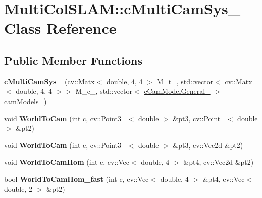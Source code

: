 \hypertarget{classMultiColSLAM_1_1cMultiCamSys__}{}\section{Multi\+Col\+S\+L\+AM\+:\+:c\+Multi\+Cam\+Sys\+\_\+ Class Reference}
\label{classMultiColSLAM_1_1cMultiCamSys__}
\subsection*{Public Member Functions}
\begin{DoxyCompactItemize}
\item 
{\bfseries c\+Multi\+Cam\+Sys\+\_\+} (cv\+::\+Matx$<$ double, 4, 4 $>$ M\+\_\+t\+\_\+, std\+::vector$<$ cv\+::\+Matx$<$ double, 4, 4 $>$$>$ M\+\_\+c\+\_\+, std\+::vector$<$ \hyperlink{classMultiColSLAM_1_1cCamModelGeneral__}{c\+Cam\+Model\+General\+\_\+} $>$ cam\+Models\+\_\+)\hypertarget{classMultiColSLAM_1_1cMultiCamSys___a94d83f3bd851844d9b86866b899aac14}{}\label{classMultiColSLAM_1_1cMultiCamSys___a94d83f3bd851844d9b86866b899aac14}

\item 
void {\bfseries World\+To\+Cam} (int c, cv\+::\+Point3\+\_\+$<$ double $>$ \&pt3, cv\+::\+Point\+\_\+$<$ double $>$ \&pt2)\hypertarget{classMultiColSLAM_1_1cMultiCamSys___a5252fc027f0a0f8db1b096392302eae8}{}\label{classMultiColSLAM_1_1cMultiCamSys___a5252fc027f0a0f8db1b096392302eae8}

\item 
void {\bfseries World\+To\+Cam} (int c, cv\+::\+Point3\+\_\+$<$ double $>$ \&pt3, cv\+::\+Vec2d \&pt2)\hypertarget{classMultiColSLAM_1_1cMultiCamSys___abfc2a17f67cd88fbf51e1459b5618c96}{}\label{classMultiColSLAM_1_1cMultiCamSys___abfc2a17f67cd88fbf51e1459b5618c96}

\item 
void {\bfseries World\+To\+Cam\+Hom} (int c, cv\+::\+Vec$<$ double, 4 $>$ \&pt4, cv\+::\+Vec2d \&pt2)\hypertarget{classMultiColSLAM_1_1cMultiCamSys___a9e6567244dbfa1fc64b2a59ba4653559}{}\label{classMultiColSLAM_1_1cMultiCamSys___a9e6567244dbfa1fc64b2a59ba4653559}

\item 
bool {\bfseries World\+To\+Cam\+Hom\+\_\+fast} (int c, cv\+::\+Vec$<$ double, 4 $>$ \&pt4, cv\+::\+Vec$<$ double, 2 $>$ \&pt2)\hypertarget{classMultiColSLAM_1_1cMultiCamSys___a3b69acbfaf8be51d44ba4b6fa59afa13}{}\label{classMultiColSLAM_1_1cMultiCamSys___a3b69acbfaf8be51d44ba4b6fa59afa13}


\end{DoxyCompactItemize}
